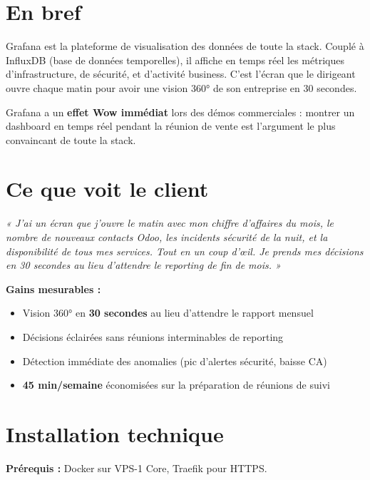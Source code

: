 \documentclass[11pt, a4paper]{article}
\begin{document}
\ficheHeader

\section*{En bref}
Grafana est la plateforme de visualisation des données de toute la stack. Couplé à InfluxDB (base de données temporelles), il affiche en temps réel les métriques d'infrastructure, de sécurité, et d'activité business. C'est l'écran que le dirigeant ouvre chaque matin pour avoir une vision 360° de son entreprise en 30 secondes.

\begin{pointcle}
  Grafana a un \textbf{effet Wow immédiat} lors des démos commerciales : montrer un dashboard en temps réel pendant la réunion de vente est l'argument le plus convaincant de toute la stack.
\end{pointcle}

\section{Ce que voit le client}

\begin{clientbox}
  \textit{« J'ai un écran que j'ouvre le matin avec mon chiffre d'affaires du mois, le nombre de nouveaux contacts Odoo, les incidents sécurité de la nuit, et la disponibilité de tous mes services. Tout en un coup d'œil. Je prends mes décisions en 30 secondes au lieu d'attendre le reporting de fin de mois. »}
\end{clientbox}

\textbf{Gains mesurables :}
\begin{itemize}
  \item Vision 360° en \textbf{30 secondes} au lieu d'attendre le rapport mensuel
  \item Décisions éclairées sans réunions interminables de reporting
  \item Détection immédiate des anomalies (pic d'alertes sécurité, baisse CA)
  \item \textbf{45 min/semaine} économisées sur la préparation de réunions de suivi
\end{itemize}

\section{Installation technique}

\textbf{Prérequis :} Docker sur VPS-1 Core, Traefik pour HTTPS.
\end{document}

